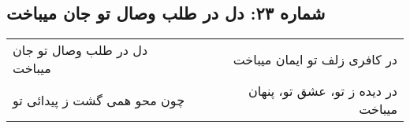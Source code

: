 \begin{center}
\section*{شماره ۲۳: دل در طلب وصال تو جان میباخت}
\label{sec:023}
\begin{longtable}{l p{0.5cm} r}
دل در طلب وصال تو جان میباخت
&&
در کافری زلف تو ایمان میباخت
\\
چون محو همی گشت ز پیدائی تو
&&
در دیده ز تو، عشق تو، پنهان میباخت
\\
\end{longtable}
\end{center}
